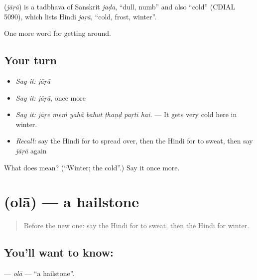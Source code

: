 \begin{cousinweb}
\textbf{} (\emph{jāṛā}) is a tadbhava of Sanskrit \emph{jaḍa}, \textquotedblleft{}dull, numb\textquotedblright{} and also \textquotedblleft{}cold\textquotedblright{} (CDIAL 5090), which lists Hindi \emph{jaṛā}, \textquotedblleft{}cold, frost, winter\textquotedblright{}.
\end{cousinweb}

\begin{grammarlens}[title={What you've built}]
One more word for getting around.
\end{grammarlens}

\subsection*{Your turn}
\begin{itemize}
\raggedright
  \item \emph{Say it:} \emph{jāṛā}
  \item \emph{Say it:} \emph{jāṛā}, once more
  \item \emph{Say it:} \emph{jāṛe meṁ yahā̃ bahut ṭhaṇḍ paṛtī hai.} — It gets very cold here in winter.
  \item \emph{Recall:} say the Hindi for to spread over, then the Hindi for to sweat, then say \emph{jāṛā} again
\end{itemize}

\begin{tcolorbox}[breakable,colback=teal!4,colframe=teal!35!black,title={Before you move on}]
What does  mean? (\textquotedblleft{}Winter; the cold\textquotedblright{}.) Say it once more.
\end{tcolorbox}
\section[\texorpdfstring{\hi{ओला} (olā)}{ओला (olā)}]{ (olā) — a hailstone}

\label{lesson:HI-C438-ola}



\begin{quote}
Before the new one: say the Hindi for to sweat, then the Hindi for winter.
\end{quote}

\subsection*{You'll want to know: }
\textbf{} — \emph{olā} — \textquotedblleft{}a hailstone\textquotedblright{}.

